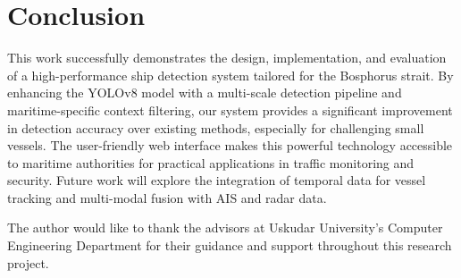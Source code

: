 \documentclass[10pt]{article}
\begin{document}
\section{Conclusion}
This work successfully demonstrates the design, implementation, and evaluation of a high-performance ship detection system tailored for the Bosphorus strait. By enhancing the YOLOv8 model with a multi-scale detection pipeline and maritime-specific context filtering, our system provides a significant improvement in detection accuracy over existing methods, especially for challenging small vessels. The user-friendly web interface makes this powerful technology accessible to maritime authorities for practical applications in traffic monitoring and security. Future work will explore the integration of temporal data for vessel tracking and multi-modal fusion with AIS and radar data.

\begin{acknowledgements}
The author would like to thank the advisors at Uskudar University's Computer Engineering Department for their guidance and support throughout this research project.
\end{acknowledgements}



\end{document}
